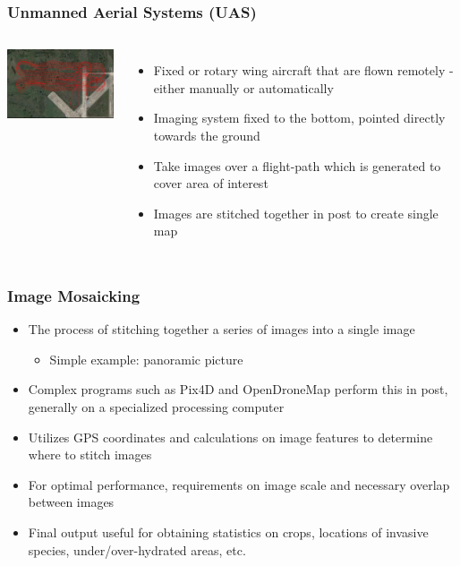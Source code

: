 \documentclass{beamer}
\begin{document}
\begin{frame}
\frametitle{Unmanned Aerial Systems (UAS)}
\begin{columns}
    \begin{center}
      \includegraphics[width=5cm]{Figures/flightpath}
    \end{center}
    \begin{itemize}
      \item Fixed or rotary wing aircraft that are flown remotely - either manually or automatically
      \item Imaging system fixed to the bottom, pointed directly towards the ground
      \item Take images over a flight-path which is generated to cover area of interest
      \item Images are stitched together in post to create single map
    \end{itemize}
\end{columns}
\end{frame}


\begin{frame}
\frametitle{Image Mosaicking}
\begin{itemize}
  \item The process of stitching together a series of images into a single image
  \begin{itemize}
    \item Simple example: panoramic picture
  \end{itemize}
  \item Complex programs such as Pix4D and OpenDroneMap perform this in post, generally on a specialized processing computer
  \item Utilizes GPS coordinates and calculations on image features to determine where to stitch images
  \item For optimal performance, requirements on image scale and necessary overlap between images
  \item Final output useful for obtaining statistics on crops, locations of invasive species, under/over-hydrated areas, etc.
\end{itemize}
\end{frame}
\end{document}
